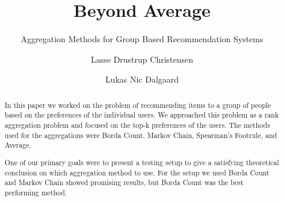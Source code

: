\documentclass[sigplan]{acmart}
\begin{document}
\title{Beyond Average}
\subtitle{Aggregation Methods for Group Based Recommendation Systems}

\author{Lasse Drustrup Christensen}

\author{Lukas Nic Dalgaard}



\begin{abstract}
In this paper we worked on the problem of recommending items to a group of people based on the preferences of the individual users. We approached this problem as a rank aggregation problem and focused on the top-k preferences of the users.
The methods used for the aggregations were Borda Count, Markov Chain, Spearman's Footrule, and Average.

One of our primary goals were to present a testing setup to give a satisfying theoretical conclusion on which aggregation method to use. For the setup we used Borda Count and Markov Chain showed promising results, but Borda Count was the best performing method.
\end{abstract}



\maketitle



%







 

\newpage


\end{document}
